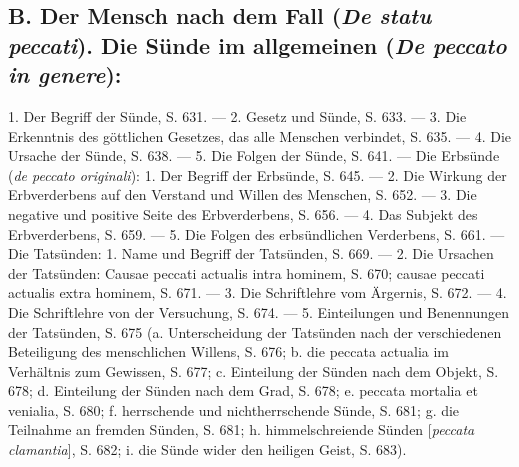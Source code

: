 \documentclass{article}
\begin{document}
\subsection*{B. Der Mensch nach dem Fall (\emph{De statu peccati}). Die Sünde im allgemeinen (\emph{De peccato in genere}):}
1. Der Begriff der Sünde, S. 631. --- 2. Gesetz und Sünde, S. 633. --- 3. Die Erkenntnis des göttlichen Gesetzes, das alle Menschen verbindet, S. 635. --- 4. Die Ursache der Sünde, S. 638. --- 5. Die Folgen der Sünde, S. 641. --- Die Erbsünde (\emph{de peccato originali}): 1. Der Begriff der Erbsünde, S. 645. --- 2. Die Wirkung der Erbverderbens auf den Verstand und Willen des Menschen, S. 652. --- 3. Die negative und positive Seite des Erbverderbens, S. 656. --- 4. Das Subjekt des Erbverderbens, S. 659. --- 5. Die Folgen des erbsündlichen Verderbens, S. 661. --- Die Tatsünden: 1. Name und Begriff der Tatsünden, S. 669. --- 2. Die Ursachen der Tatsünden: Causae peccati actualis intra hominem, S. 670; causae peccati actualis extra hominem, S. 671. --- 3. Die Schriftlehre vom Ärgernis, S. 672. --- 4. Die Schriftlehre von der Versuchung, S. 674. --- 5. Einteilungen und Benennungen der Tatsünden, S. 675 (a. Unterscheidung der Tatsünden nach der verschiedenen Beteiligung des menschlichen Willens, S. 676; b. die peccata actualia im Verhältnis zum Gewissen, S. 677; c. Einteilung der Sünden nach dem Objekt, S. 678; d. Einteilung der Sünden nach dem Grad, S. 678; e. peccata mortalia et venialia, S. 680; f. herrschende und nichtherrschende Sünde, S. 681; g. die Teilnahme an fremden Sünden, S. 681; h. himmelschreiende Sünden [\emph{peccata clamantia}], S. 682; i. die Sünde wider den heiligen Geist, S. 683).
\end{document}
